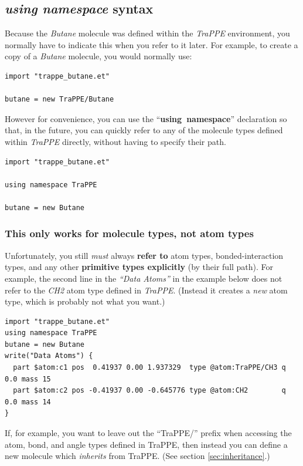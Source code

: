 \documentclass[11pt]{article}
\begin{document}
\subsection{\textit{using namespace} syntax}
\label{sec:using_namespaces}

Because the \textit{Butane} molecule was defined within the \textit{TraPPE}
environment, you normally have to indicate this when you refer to it later.
For example, to create a copy of a \textit{Butane} molecule, 
you would normally use:
\begin{verbatim}
import "trappe_butane.et"

butane = new TraPPE/Butane
\end{verbatim}

However for convenience, you can use the 
\mbox{``\textbf{using namespace}''} declaration 
so that, in the future, you can quickly refer to any 
of the molecule types defined within \textit{TraPPE} directly, 
without having to specify their path.
\begin{verbatim}
import "trappe_butane.et"

using namespace TraPPE

butane = new Butane
\end{verbatim}
\subsubsection*{This only works for molecule types, not atom types}
Unfortunately, you still \textit{must} always
\textbf{refer to} atom types, bonded-interaction types, and any other
\textbf{primitive types explicitly} (by their full path).
For example, the second line in the \textit{``Data Atoms''} in the example
below does not refer to the \textit{CH2} atom type defined in \textit{TraPPE}.
(Instead it creates a \textit{new} atom type, 
which is probably not what you want.)
\begin{verbatim}
import "trappe_butane.et"
using namespace TraPPE
butane = new Butane
write("Data Atoms") {
  part $atom:c1 pos  0.41937 0.00 1.937329  type @atom:TraPPE/CH3 q 0.0 mass 15
  part $atom:c2 pos -0.41937 0.00 -0.645776 type @atom:CH2        q 0.0 mass 14
}
\end{verbatim}
If, for example, you want to leave out the ``TraPPE/'' prefix 
when accessing the atom, bond, and angle types defined in TraPPE,
then instead you can define a new molecule which 
\textit{inherits} from TraPPE. (See section \ref{sec:inheritance}.)
\end{document}
